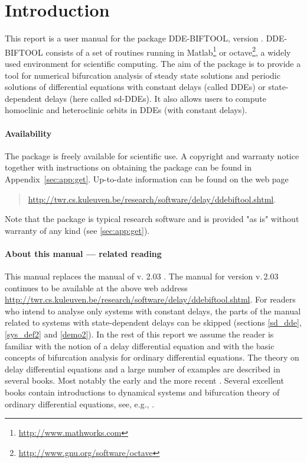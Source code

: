 \documentclass[10pt]{scrartcl}
\newcommand{\DDEBIFCODE}{\textsc{DDE-BIFTOOL}}
\newcommand{\ddebifweb}{\url{http://twr.cs.kuleuven.be/research/software/delay/ddebiftool.shtml}}
\begin{document}
\section{Introduction}
\label{sec:intro}
This report is a user manual for the package {\DDEBIFCODE}, version
\version{}. {\DDEBIFCODE} consists of a set of routines running in
Matlab\footnote{\url{http://www.mathworks.com}} \cite{Mat00} or
octave\footnote{\url{http://www.gnu.org/software/octave}}, a widely
used environment for scientific computing.  The aim of the package is
to provide a tool for numerical bifurcation analysis of steady state
solutions and periodic solutions of differential equations with
constant delays (called DDEs) or state-dependent delays (here called
sd-DDEs).  It also allows users to compute homoclinic and heteroclinic
orbits in DDEs (with constant delays).  

\paragraph{Availability}
The package is freely available for scientific use.  %
A copyright and warranty notice together with
instructions on obtaining the package can be found in
Appendix~\ref{sec:app:get}.  Up-to-date information can be found on the web
page
\begin{quote}
  \ddebifweb{}.
\end{quote}
Note that the package is typical research software and is provided "as
is" without warranty of any kind (see \ref{sec:app:get}).


\paragraph{About this manual --- related reading}
This manual replaces the manual of v. 2.03 \cite{ELS01}. The manual
for version v.\,2.03 continues to be available at the above web
address \ddebifweb{}.  For readers who intend to analyse only systems
with constant delays, the parts of the manual related to systems with
state-dependent delays can be skipped (sections \ref{sd_dde},
\ref{sys_def2} and \ref{demo2}).  In the rest of this report we assume
the reader is familiar with the notion of a delay differential
equation and with the basic concepts of bifurcation analysis for
ordinary differential equations.  The theory on delay differential
equations and a large number of examples are described in several
books. Most notably the early
\cite{Bell63,El's73,Driv77,Hale77a,Kolm86} and the more recent
\cite{Azbe91,Kolm92,Hale93,Diek95,Kolm99}.  Several excellent books
contain introductions to dynamical systems and bifurcation theory of
ordinary differential equations, see, e.g.,
\cite{Chow82,Guck83,Argy94,Seyd94,Kuzn04}.
\end{document}
